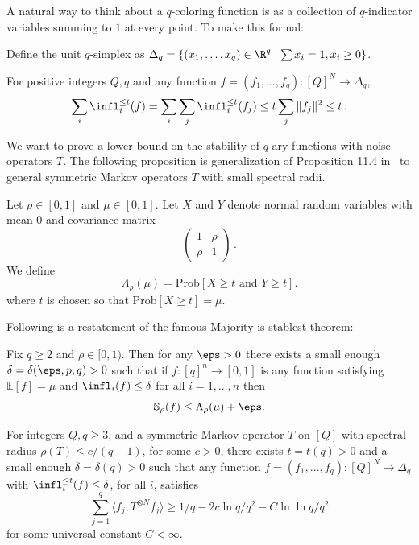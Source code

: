 %
A natural way to think about a $q$-coloring function is as a
collection of $q$-indicator variables summing to $1$ at every point.
To make this formal:
%
\begin{definition}
  Define the unit $q$-simplex as $\Delta_q = \{(x_1,\ldots,x_{q}) \in
  \R^q \mid \sum x_i = 1, x_i \ge 0\}$.
\end{definition}
%
\begin{observation}\label{obs:infbndsimplex}
  For positive integers $Q,q$ and any function
  $f=(f_1,\ldots,f_q):[Q]^N\to \Delta_q$, \[\sum_i \infl^{\le t}_i(f) =
  \sum_i \sum_j \infl^{\le t}_i (f_j) \le t \sum_j \|f_j\|^2 \le t\,.\]
\end{observation}
%
%
We want to prove a lower bound on the stability of $q$-ary functions
with noise operators $T$. The following proposition is generalization
of Proposition 11.4 in~\cite{KKMO} to general symmetric Markov
operators $T$ with small spectral radii.
%
%
\begin{definition}
  \label{def:gamma-rho}
  Let $\rho\in[0,1]$ and $\mu\in[0,1]$. Let $X$ and $Y$ denote
normal random variables with mean $0$ and covariance matrix 
\[
\begin{pmatrix}
  1 & \rho \\ \rho & 1
\end{pmatrix}\,.
\]
We define
\[
\Lambda_{\rho}(\mu) = \mathrm{Prob}\left[X\ge t\mbox{ and }Y\ge
  t\right].
\]
where $t$ is chosen so that $\mathrm{Prob}[X\ge t] = \mu$.
\end{definition}
Following is a restatement of the famous Majority is stablest theorem:
\begin{theorem}
  Fix $q\ge 2$ and $\rho\in[0,1)$. Then for any $\eps>0$ there exists
  a small enough $\delta=\delta(\eps,p,q)>0$ such that if
  $f:[q]^n\to[0,1]$ is any function satisfying $\mathbb{E}[f] = \mu$
  and $\infl_i(f)\le \delta$ for all $i=1,\ldots,n$ then
\[
\mathbb{S}_{\rho}(f)\le \Lambda_{\rho}(\mu)+\eps.
\]
\end{theorem}
\begin{proposition}
\label{prop:stab}
For integers $Q,q \ge 3$, and a symmetric Markov operator $T$ on $[Q]$
with spectral radius $\rho(T)\le {c}/{(q-1)}$, for some $c>0$, there
exists $t=t(q)>0$ and a small enough $\delta=\delta(q)>0$ such
that %
any function $f=(f_1,\ldots,f_q):[Q]^N\rightarrow \Delta_q$ with
$\infl_i^{\le t} (f)\le \delta$, for all $i$, satisfies
  \[ \sum_{j=1}^q 
\langle f_j, T^{\otimes N} f_j\rangle 
%
\ge 1/q - 2 c \ln q/q^2 - C
  \ln\ln q /q^2\] for some universal constant $C<\infty$.
\end{proposition}
